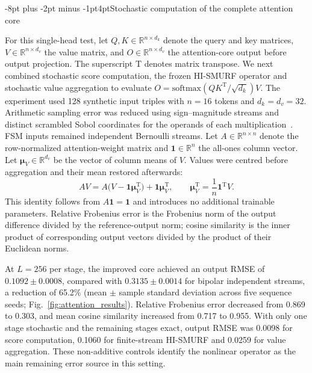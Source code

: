 \documentclass[pdflatex,sn-mathphys-num]{sn-jnl}
\makeatletter
\renewcommand\subsection{\@startsection{subsection}{2}{\z@}%
  {-8pt plus -2pt minus -1pt}{4pt}{\subsectionfont}}
\theoremstyle{thmstyleone}
\theoremstyle{thmstyletwo}
\theoremstyle{thmstylethree}
\makeatother
\begin{document}
\subsection{Stochastic computation of the complete attention core}
\label{sec:sc_attention}

For this single-head test, let $Q,K\in\mathbb{R}^{n\times d_k}$ denote the query and key matrices, $V\in\mathbb{R}^{n\times d_v}$ the value matrix, and $O\in\mathbb{R}^{n\times d_v}$ the attention-core output before output projection. The superscript $\mathrm{T}$ denotes matrix transpose. We next combined stochastic score computation, the frozen HI-SMURF
operator and stochastic value aggregation to evaluate
$O=\mathrm{softmax}(QK^{\mathrm T}/\sqrt{d_k})V$.
The experiment used 128 synthetic input triples with $n=16$ tokens
and $d_k=d_v=32$. Arithmetic sampling error was reduced using
sign--magnitude streams and distinct scrambled Sobol coordinates for
the operands of each multiplication~\cite{sobol1967distribution,owen1995scrambling,najafi2018discrepancy}. FSM inputs remained independent
Bernoulli streams. Let $A\in\mathbb{R}^{n\times n}$ denote the row-normalized attention-weight matrix and $\mathbf{1}\in\mathbb{R}^{n}$ the all-ones column vector. Let $\boldsymbol{\mu}_V\in\mathbb{R}^{d_v}$ be the vector of column means of $V$. Values were centred before aggregation and their
mean restored afterwards:
\begin{equation}
AV = A\bigl(V-\mathbf{1}\boldsymbol{\mu}_V^{\mathrm T}\bigr) + \mathbf{1}\boldsymbol{\mu}_V^{\mathrm T}, \qquad \boldsymbol{\mu}_V^{\mathrm T} = \frac{1}{n}\mathbf{1}^{\mathrm T}V. \label{eq:attention_value_centering}
\end{equation}
This identity follows from $A\mathbf{1}=\mathbf{1}$ and introduces
no additional trainable parameters. Relative Frobenius error is the Frobenius norm of the output difference divided by the reference-output norm; cosine similarity is the inner product of corresponding output vectors divided by the product of their Euclidean norms.

At $L=256$ per stage, the improved core achieved an output RMSE of
$0.1092\pm0.0008$, compared with $0.3135\pm0.0014$ for bipolar
independent streams, a reduction of 65.2\%
(mean $\pm$ sample standard deviation across five sequence seeds;
Fig.~\ref{fig:attention_results}).
Relative Frobenius error decreased from 0.869 to 0.303, and mean
cosine similarity increased from 0.717 to 0.955.
With only one stage stochastic and the remaining stages exact,
output RMSE was 0.0098 for score computation, 0.1060 for finite-stream
HI-SMURF and 0.0259 for value aggregation.
These non-additive controls identify the nonlinear operator as the
main remaining error source in this setting.
\end{document}
